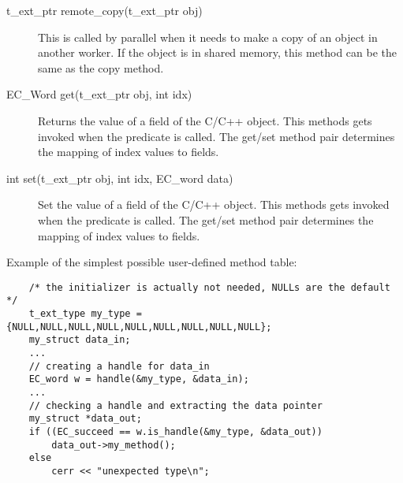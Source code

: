 \begin{description}
\item[t_ext_ptr remote_copy(t_ext_ptr obj)]
This is called by parallel {\eclipse} when it needs to make a copy of an
object in another worker. If the object is in shared memory, this method
can be the same as the copy method.

\item[EC_Word get(t_ext_ptr obj, int idx)]
Returns the value of a field of the C/C++ object.
This methods gets invoked when the {\eclipse} predicate  is called.
The get/set method pair determines the mapping of index values to fields.

\item[int set(t_ext_ptr obj, int idx, EC_word data)]
Set the value of a field of the C/C++ object.
This methods gets invoked when the {\eclipse} predicate  is called.
The get/set method pair determines the mapping of index values to fields.
\end{description}

Example of the simplest possible user-defined method table:
\begin{verbatim}
    /* the initializer is actually not needed, NULLs are the default */
    t_ext_type my_type = {NULL,NULL,NULL,NULL,NULL,NULL,NULL,NULL,NULL};
    my_struct data_in;
    ...
    // creating a handle for data_in
    EC_word w = handle(&my_type, &data_in);
    ...
    // checking a handle and extracting the data pointer
    my_struct *data_out;
    if ((EC_succeed == w.is_handle(&my_type, &data_out))
        data_out->my_method();
    else
        cerr << "unexpected type\n";
\end{verbatim}




